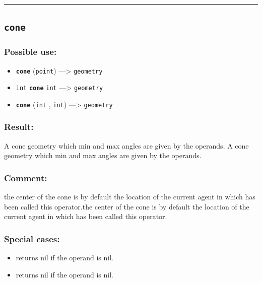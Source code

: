 \documentclass[]{book}
\providecommand{\tightlist}{%
  \setlength{\itemsep}{0pt}\setlength{\parskip}{0pt}}
\theoremstyle{definition}
\theoremstyle{definition}
\theoremstyle{definition}
\theoremstyle{remark}
\begin{document}
\begin{center}\rule{0.5\linewidth}{\linethickness}\end{center}

\subsection{\texorpdfstring{\texttt{cone}}{cone}}\label{cone}

\subsubsection{Possible use:}\label{possible-use-94}

\begin{itemize}
\tightlist
\item
  \textbf{\texttt{cone}} (\texttt{point}) ---\textgreater{}
  \texttt{geometry}
\item
  \texttt{int} \textbf{\texttt{cone}} \texttt{int} ---\textgreater{}
  \texttt{geometry}
\item
  \textbf{\texttt{cone}} (\texttt{int} , \texttt{int}) ---\textgreater{}
  \texttt{geometry}
\end{itemize}

\subsubsection{Result:}\label{result-92}

A cone geometry which min and max angles are given by the operands. A
cone geometry which min and max angles are given by the operands.

\subsubsection{Comment:}\label{comment-22}

the center of the cone is by default the location of the current agent
in which has been called this operator.the center of the cone is by
default the location of the current agent in which has been called this
operator.

\subsubsection{Special cases:}\label{special-cases-30}

\begin{itemize}
\tightlist
\item
  returns nil if the operand is nil.\\
\item
  returns nil if the operand is nil.
\end{itemize}
\end{document}
